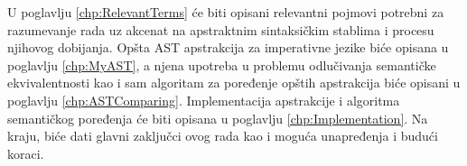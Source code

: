 U poglavlju \ref{chp:RelevantTerms} će biti opisani relevantni pojmovi potrebni za razumevanje rada uz akcenat na apstraktnim sintaksičkim stablima i procesu njihovog dobijanja. Opšta AST apstrakcija za imperativne jezike biće opisana u poglavlju \ref{chp:MyAST}, a njena upotreba u problemu odlučivanja semantičke ekvivalentnosti kao i sam algoritam za poređenje opštih apstrakcija biće opisani u poglavlju \ref{chp:ASTComparing}. Implementacija apstrakcije i algoritma semantičkog poređenja će biti opisana u poglavlju \ref{chp:Implementation}. Na kraju, biće dati glavni zaključci ovog rada kao i moguća unapređenja i budući koraci. 
